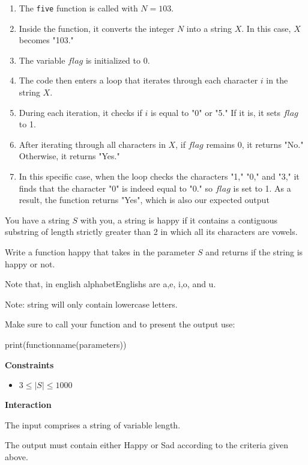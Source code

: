 \documentclass[a4paper]{exam}
\newcommand\heading[1]{\textbf{#1}}
\newcommand\alert[2]{\centerline{\textbf\large{\underline{\color{#1}{#2}}}}}
\begin{document}
\begin{questions}
\begin{enumerate}
    \item The \texttt{five} function is called with $N=103$.
    \item Inside the function, it converts the integer $N$ into a string $X$. In this case, $X$ becomes "103."
    \item The variable $flag$ is initialized to 0.
    \item The code then enters a loop that iterates through each character $i$ in the string $X.$
    \item During each iteration, it checks if $i$ is equal to "0" or "5." If it is, it sets $flag$ to 1.
    \item After iterating through all characters in $X$, if $flag$ remains 0, it returns "No." Otherwise, it returns "Yes."
    \item  In this specific case, when the loop checks the characters "1," "0," and "3," it finds that the character "0" is indeed equal to "0." so $flag$ is set to 1. As a result, the function returns "Yes", which is also our expected output 
\end{enumerate}


\alert{Green} {This means the applied logic is correct}

    You have a string $S$ with you, a string is happy if it contains a contiguous substring of length strictly greater than 2 in which all its characters are vowels.

    Write a function happy that takes in the parameter $S$ and returns if the string is happy or not.

    Note that, in english alphabetEnglishs are a,e, i,o, and u.

    Note: string will only contain lowercase letters.

    Make sure to call your function and to present the output use:


    print(functionname(parameters))

    \heading{Constraints}
    \begin{itemize}
        \item $ 3 \leq |S| \le 1000$

    \end{itemize}

    \heading{Interaction}

    The input comprises a string of variable length.

    The output must contain either Happy or Sad according to the criteria given above.


\end{questions}
\end{document}
